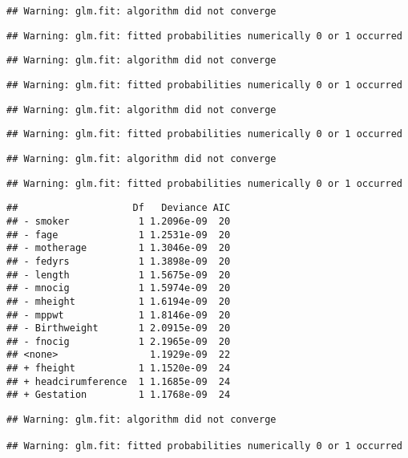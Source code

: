\documentclass[]{article}
\begin{document}
\begin{verbatim}
## Warning: glm.fit: algorithm did not converge
\end{verbatim}

\begin{verbatim}
## Warning: glm.fit: fitted probabilities numerically 0 or 1 occurred
\end{verbatim}

\begin{verbatim}
## Warning: glm.fit: algorithm did not converge
\end{verbatim}

\begin{verbatim}
## Warning: glm.fit: fitted probabilities numerically 0 or 1 occurred
\end{verbatim}

\begin{verbatim}
## Warning: glm.fit: algorithm did not converge
\end{verbatim}

\begin{verbatim}
## Warning: glm.fit: fitted probabilities numerically 0 or 1 occurred
\end{verbatim}

\begin{verbatim}
## Warning: glm.fit: algorithm did not converge
\end{verbatim}

\begin{verbatim}
## Warning: glm.fit: fitted probabilities numerically 0 or 1 occurred
\end{verbatim}

\begin{verbatim}
##                    Df   Deviance AIC
## - smoker            1 1.2096e-09  20
## - fage              1 1.2531e-09  20
## - motherage         1 1.3046e-09  20
## - fedyrs            1 1.3898e-09  20
## - length            1 1.5675e-09  20
## - mnocig            1 1.5974e-09  20
## - mheight           1 1.6194e-09  20
## - mppwt             1 1.8146e-09  20
## - Birthweight       1 2.0915e-09  20
## - fnocig            1 2.1965e-09  20
## <none>                1.1929e-09  22
## + fheight           1 1.1520e-09  24
## + headcirumference  1 1.1685e-09  24
## + Gestation         1 1.1768e-09  24
\end{verbatim}

\begin{verbatim}
## Warning: glm.fit: algorithm did not converge

## Warning: glm.fit: fitted probabilities numerically 0 or 1 occurred
\end{verbatim}
\end{document}
